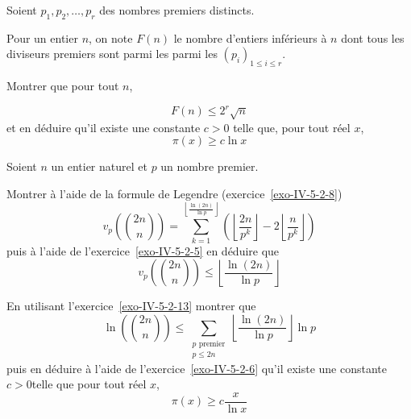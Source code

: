 \begin{exo}
Soient $p_1, p_2, \ldots, p_r$ des nombres premiers distincts.

Pour un entier $n$, on note $F(n)$ le nombre d'entiers inférieurs à $n$ dont tous les diviseurs premiers sont parmi les parmi les $(p_i)_{1 \le i \le r}$.

Montrer que pour tout $n$,

$$F(n) \le 2^r \sqrt n$$
et en déduire qu'il existe une constante $c>0$ telle que, pour tout réel $x$,
$$\pi(x) \ge c \ln x$$
\end{exo}

\begin{exo}
Soient $n$ un entier naturel et $p$ un nombre premier.

Montrer à l'aide de la formule de Legendre (exercice~\ref{exo-IV-5-2-8})
$$v_p\left( \binom{2n} n\right) = \sum_{k = 1}^{\left\lfloor \frac{\ln(2n)}{\ln p} \right\rfloor} \left(\left\lfloor \frac{2n}{p^k} \right\rfloor - 2 \left\lfloor \frac n{p^k} \right\rfloor  \right)$$
puis à l'aide de l'exercice~\ref{exo-IV-5-2-5} en déduire que
$$v_p\left( \binom{2n} n\right) \le \left\lfloor \frac{\ln(2n)}{\ln p} \right\rfloor$$
\end{exo}

\begin{exo}
    En utilisant l'exercice~\ref{exo-IV-5-2-13} montrer que
    $$\ln \left( \binom{2n} n\right) \le \sum_{\substack{p \text{ premier} \\ p \le 2n }} \left\lfloor \frac{\ln(2n)}{\ln p} \right\rfloor \ln p$$ puis en déduire à l'aide de l'exercice~\ref{exo-IV-5-2-6} qu'il existe une constante $c>0$telle que pour tout réel $x$,
    $$\pi(x) \ge c \frac{x}{\ln x}$$
\end{exo}


